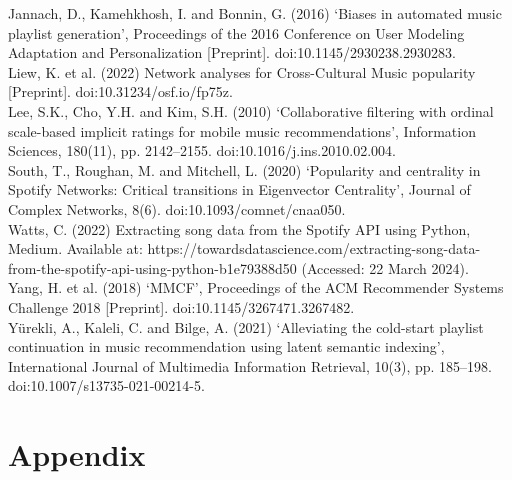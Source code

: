 \documentclass[conference]{IEEEtran}
\begin{document}
\begin{thebibliography}{00}
 Jannach, D., Kamehkhosh, I. and Bonnin, G. (2016) ‘Biases in automated music playlist generation’, Proceedings of the 2016 Conference on User Modeling Adaptation and Personalization [Preprint]. doi:10.1145/2930238.2930283. \\

 Liew, K. et al. (2022) Network analyses for Cross-Cultural Music popularity [Preprint]. doi:10.31234/osf.io/fp75z. \\

 Lee, S.K., Cho, Y.H. and Kim, S.H. (2010) ‘Collaborative filtering with ordinal scale-based implicit ratings for mobile music recommendations’, Information Sciences, 180(11), pp. 2142–2155. doi:10.1016/j.ins.2010.02.004. \\

 South, T., Roughan, M. and Mitchell, L. (2020) ‘Popularity and centrality in Spotify Networks: Critical transitions in Eigenvector Centrality’, Journal of Complex Networks, 8(6). doi:10.1093/comnet/cnaa050. \\

 Watts, C. (2022) Extracting song data from the Spotify API using Python, Medium. Available at: https://towardsdatascience.com/extracting-song-data-from-the-spotify-api-using-python-b1e79388d50 (Accessed: 22 March 2024). \\

 Yang, H. et al. (2018) ‘MMCF’, Proceedings of the ACM Recommender Systems Challenge 2018 [Preprint]. doi:10.1145/3267471.3267482. \\

 Yürekli, A., Kaleli, C. and Bilge, A. (2021) ‘Alleviating the cold-start playlist continuation in music recommendation using latent semantic indexing’, International Journal of Multimedia Information Retrieval, 10(3), pp. 185–198. doi:10.1007/s13735-021-00214-5.

\end{thebibliography}

\vspace{12pt}

\section{Appendix}
\end{document}
